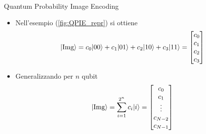 \documentclass{beamer}
\DeclarePairedDelimiter\ket{\lvert}{\rangle}
\begin{document}
	\begin{frame}{Quantum Probability Image Encoding}
		\begin{itemize}
			\item Nell'esempio
			(\ref{fig:QPIE_repr})
			si ottiene
			\[
			\ket{\text{Img}} 
				= c_0 \ket{00} + c_1 \ket{01} + c_2 \ket{10} + c_3 \ket{11}
				= \begin{bmatrix}
					c_0\\c_1\\c_2\\c_3
				\end{bmatrix}
			\]
			\pause
			\item Generalizzando per $n$ qubit
			\[
				\ket{\text{Img}} 
					= \sum_{i=1}^{2^n} c_i \ket{i}
					= \begin{bmatrix}
						c_0\\c_1\\ \vdots\\c_{N-2}\\c_{N-1}
				\end{bmatrix}
			\]
		\end{itemize}

	\end{frame}
\end{document}

